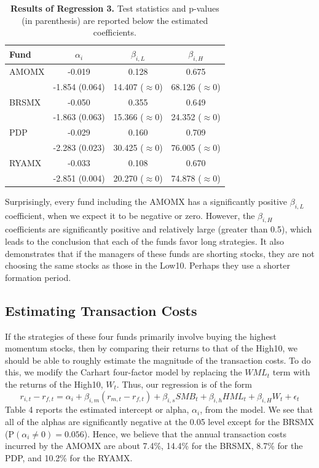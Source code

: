 \documentclass[12pt]{article}
\begin{document}
\begin{table}[h]
\centering
\caption{\textbf{Results of Regression 3.} \footnotesize{Test statistics and p-values (in parenthesis) are reported below the estimated coefficients.}}
\begin{tabular}{l | c | c | c }
\hline
Fund & $\alpha_{i}$ & $\beta_{i,L}$ & $\beta_{i,H}$ \\
\hline
AMOMX & -0.019 & 0.128 & 0.675 \\
 & -1.854 (0.064) & 14.407 ($\approx 0$) & 68.126 ($\approx 0$) \\
\hline
BRSMX & -0.050 & 0.355 & 0.649 \\
 & -1.863 (0.063) & 15.366 ($\approx 0$) & 24.352 ($\approx 0$) \\
\hline
PDP & -0.029 & 0.160 & 0.709 \\
 & -2.283 (0.023) & 30.425 ($\approx 0$) & 76.005 ($\approx 0$) \\
\hline
RYAMX & -0.033 & 0.108 & 0.670 \\
 & -2.851 (0.004) & 20.270 ($\approx 0$) & 74.878 ($\approx 0$) \\
\end{tabular}
\end{table}

Surprisingly, every fund including the AMOMX has a significantly positive $\beta_{i,L}$ coefficient, when we expect it to be negative or zero. However, the $\beta_{i,H}$ coefficients are significantly positive and relatively large (greater than 0.5), which leads to the conclusion that each of the funds favor long strategies. It also demonstrates that if the managers of these funds are shorting stocks, they are not choosing the same stocks as those in the Low10. Perhaps they use a shorter formation period.

\subsection{Estimating Transaction Costs}

If the strategies of these four funds primarily involve buying the highest momentum stocks, then by comparing their returns to that of the High10, we should be able to roughly estimate the magnitude of the transaction costs. To do this, we modify the Carhart four-factor model by replacing the $WML_{t}$ term with the returns of the High10, $W_{t}$. Thus, our regression is of the form
\begin{equation}
r_{i,t}-r_{f,t}=\alpha_{i}+\beta_{i,m}(r_{m,t}-r_{f,t})+\beta_{i,s}SMB_{t}+\beta_{i,h}HML_{t}+\beta_{i,H}W_{t}+\epsilon_{t}
\end{equation}
Table 4 reports the estimated intercept or alpha, $\alpha_{i}$, from the model. We see that all of the alphas are significantly negative at the 0.05 level except for the BRSMX (P$(\alpha_{i}\neq 0)=0.056$). Hence, we believe that the annual transaction costs incurred by the AMOMX are about 7.4\%, 14.4\% for the BRSMX, 8.7\% for the PDP, and 10.2\% for the RYAMX.
\end{document}
